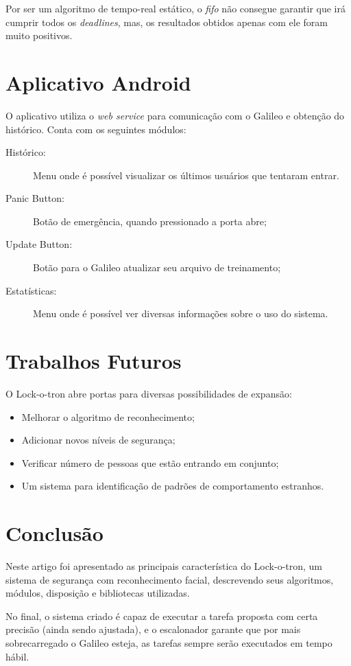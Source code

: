 \documentclass[12pt]{article}
\begin{document}
    Por ser um algoritmo de tempo-real estático, o \textit{fifo} não consegue
    garantir que irá cumprir todos os \textit{deadlines}, mas, os resultados
    obtidos apenas com ele foram muito positivos.

\section{Aplicativo Android}
    O aplicativo utiliza o \textit{web service} para comunicação com o Galileo e
    obtenção do histórico. Conta com os seguintes módulos:
    \begin{description}
        \item[Histórico:] Menu onde é possível visualizar os últimos usuários que
        tentaram entrar.
        \item[Panic Button:] Botão de emergência, quando pressionado a porta
        abre;
        \item[Update Button:] Botão para o Galileo atualizar seu arquivo de
        treinamento;
        \item[Estatísticas:] Menu onde é possível ver diversas informações sobre
        o uso do sistema.
    \end{description}


\section{Trabalhos Futuros}
    O Lock-o-tron abre portas para diversas possibilidades de expansão:
    \begin{itemize}
        \item Melhorar o algoritmo de reconhecimento;
        \item Adicionar novos níveis de segurança;
        \item Verificar número de pessoas que estão entrando em conjunto;
        \item Um sistema para identificação de padrões de comportamento estranhos.
    \end{itemize}

\section{Conclusão}
    Neste artigo foi apresentado as principais característica do Lock-o-tron, um
    sistema de segurança com reconhecimento facial, descrevendo seus algoritmos,
    módulos, disposição e bibliotecas utilizadas.

    No final, o sistema criado é capaz de executar a tarefa proposta com certa
    precisão (ainda sendo ajustada), e o escalonador garante que por mais
    sobrecarregado o Galileo esteja, as tarefas sempre serão executados em tempo
    hábil.

% 
% 
\end{document}
